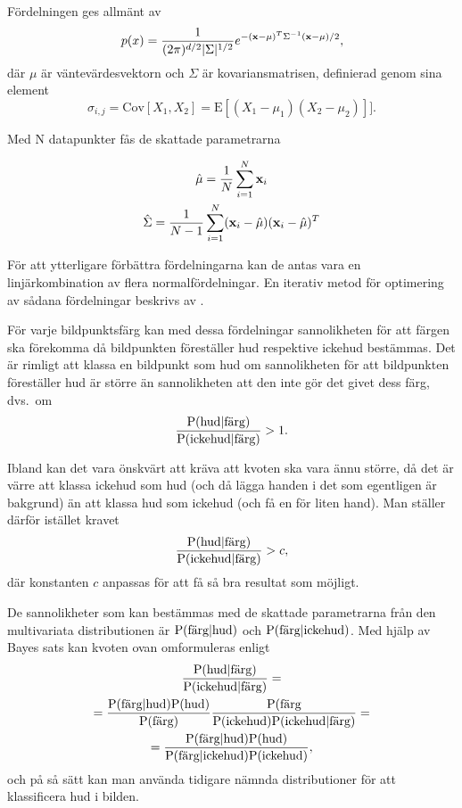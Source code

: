\documentclass[../rapport_MVEX01-11-05]{subfiles}
\begin{document}
Fördelningen ges allmänt av
\begin{equation*}
  p(x)=\frac{1}{(2\pi)^{d/2}|\Sigma|^{1/2}}e^{-(\mathbf{x}-\mu)^T\Sigma^{-1}(\mathbf{x}-\mu)/2},
\end{equation*}
där $\mu$ är väntevärdesvektorn och $\Sigma$ är kovariansmatrisen, definierad
genom sina element
\begin{equation*}
 \sigma_{i,j}=\text{Cov}[X_1,X_2]=\text{E}[(X_1-\mu_1)(X_2-\mu_2)]].
\end{equation*}

Med N datapunkter fås de skattade parametrarna

\begin{gather*}
  \hat\mu    =\frac{1}{N}\sum_{i=1}^N\mathbf{x}_i\\
  \hat\Sigma =\frac{1}{N-1}\sum_{i=1}^N(\mathbf{x}_i-\hat\mu)(\mathbf{x}_i-\hat\mu)^T
\end{gather*}

För att ytterligare förbättra fördelningarna kan de antas vara
en linjärkombination av flera normalfördelningar. En iterativ metod för optimering av
sådana fördelningar beskrivs av .

För varje bildpunktsfärg kan med dessa fördelningar sannolikheten för att färgen ska
förekomma då bildpunkten föreställer hud
respektive ickehud bestämmas. Det är rimligt att klassa en bildpunkt som
hud om sannolikheten för att bildpunkten föreställer hud är större än
sannolikheten att den inte gör det givet dess färg, dvs.~om
\begin{equation*}
	\frac{\mathrm{P}(\textrm{hud}|\textrm{färg})}{\mathrm{P}(\textrm{ickehud}|\textrm{färg})} > 1.
\end{equation*}

Ibland kan det vara önskvärt att kräva att kvoten ska vara ännu
större, då det är värre att klassa ickehud som hud (och då lägga
handen i det som egentligen är bakgrund) än att klassa hud som ickehud
(och få en för liten hand). Man ställer därför istället kravet 
\begin{equation*}
	\frac{\mathrm{P}(\textrm{hud}|\textrm{färg})}{\mathrm{P}(\textrm{ickehud}|\textrm{färg})} > c,
\end{equation*}
där konstanten $c$ anpassas för att få så bra resultat som möjligt.

De sannolikheter som kan bestämmas med de skattade parametrarna från den
multivariata distributionen är
$\mathrm{P}(\textrm{färg}|\textrm{hud})$ och
$\mathrm{P}(\textrm{färg}|\textrm{ickehud})$. Med hjälp av Bayes sats
kan kvoten ovan omformuleras enligt
\begin{multline*}
\frac{\mathrm{P}(\textrm{hud}|\textrm{färg})}{\mathrm{P}(\textrm{ickehud}|\textrm{färg})}=\\
=\frac{\mathrm{P}(\textrm{färg}|\textrm{hud})\mathrm{P}(\textrm{hud})}{\mathrm{P}(\textrm{färg})}
 \frac{\mathrm{P}(\textrm{färg}}{\mathrm{P}(\textrm{ickehud})\mathrm{P}(\textrm{ickehud}|\textrm{färg})}=\\
=\frac{\mathrm{P}(\textrm{färg}|\textrm{hud})\mathrm{P}(\textrm{hud})}{\mathrm{P}(\textrm{färg}|\textrm{ickehud})
 \mathrm{P}(\textrm{ickehud})},
\end{multline*}
och på så sätt kan man använda tidigare nämnda distributioner för att
klassificera hud i bilden. 
\end{document}
